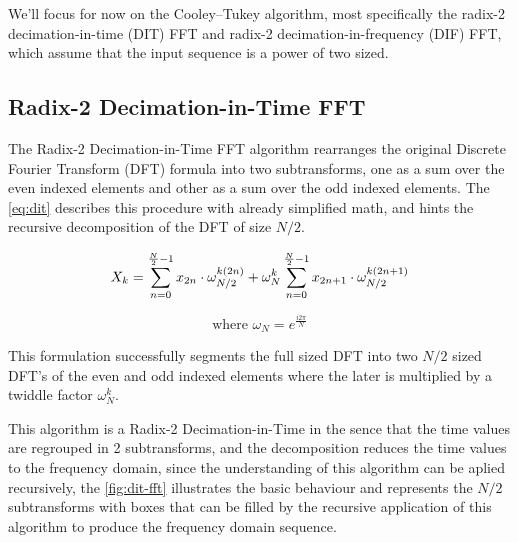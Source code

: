 \documentclass[
  oneside,
  11pt, a4paper,
  footinclude=true,
  headinclude=true,
  cleardoublepage=empty
]{scrbook}
\begin{document}
We'll focus for now on the Cooley–Tukey algorithm, most specifically the radix-2 decimation-in-time (DIT) FFT and radix-2 decimation-in-frequency (DIF) FFT, which assume that the input sequence is a power of two sized.


\subsection{Radix-2 Decimation-in-Time FFT} \label{subsec:radix-2-decimation-in-time-fft}


The Radix-2 Decimation-in-Time FFT algorithm rearranges the original Discrete Fourier Transform (DFT) formula into two subtransforms, one as a sum over the even indexed elements and other as a sum over the odd indexed elements. The \autoref{eq:dit} describes this procedure with already simplified math, and hints the recursive decomposition of the DFT of size \(N/2\).

\begin{equation} \label{eq:dit}
    X_{k} = \sum_{n=0}^{\frac{N}{2}-1}x_{2n} \cdot \omega_{N/2}^{k(2n)} + \omega_{N}^{k} \sum_{n=0}^{\frac{N}{2}-1}x_{2n+1} \cdot \omega_{N/2}^{k(2n+1)} \\
\end{equation}

\begin{equation*}
    \text{where } \omega_{N} = e^{\frac{i 2 \pi}{N}}
\end{equation*}

This formulation successfully segments the full sized DFT into two \(N/2\) sized DFT's of the even and odd indexed elements where the later is multiplied by a twiddle factor \( \omega_{N}^{k} \). 

This algorithm is a Radix-2 Decimation-in-Time in the sence that the time values are regrouped in 2 subtransforms, and the decomposition reduces the time values to the frequency domain, since the understanding of this algorithm can be aplied recursively, the \autoref{fig:dit-fft} illustrates the basic behaviour and represents the \(N/2\) subtransforms with boxes that can be filled by the recursive application of this algorithm to produce the frequency domain sequence.


\end{document}
